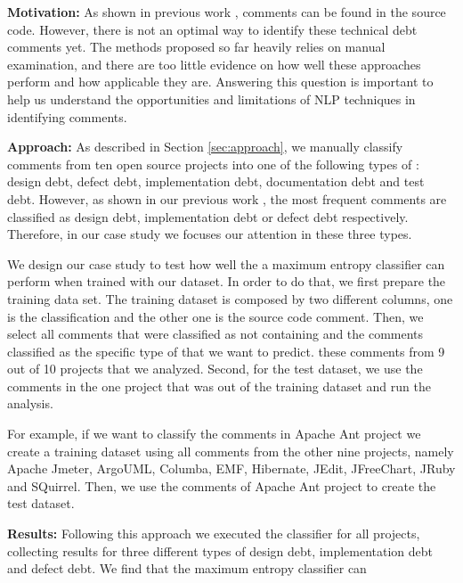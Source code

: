 \vspace{3mm}
\noindent\rqi
\vspace{3mm}

\noindent \textbf{Motivation:} As shown in previous work \cite{Potdar2014ICSME, Maldonado2015MTD}, \SATD comments can be found in the source code. However, there is not an optimal way to identify these technical debt comments yet. The methods proposed so far heavily relies on manual examination, and there are too little evidence on how well these approaches perform and how applicable they are. Answering this question is important to help us understand the opportunities and limitations of NLP techniques in identifying \SATD comments. 

\vspace{1mm}
\noindent \textbf{Approach:} As described in Section \ref{sec:approach}, we manually classify comments from ten open source projects into one of the following types of \SATD: design debt, defect debt, implementation debt, documentation debt and test debt. However, as shown in our previous work \cite{Maldonado2015MTD}, the most frequent \SATD comments are classified as design debt, implementation debt or defect debt respectively. Therefore, in our case study we focuses our attention in these three \SATD types. 

We design our case study to test how well the a maximum entropy classifier can perform when trained with our dataset. In order to do that, we first prepare the training data set. The training dataset is composed by two different columns, one is the classification and the other one is the source code comment. Then, we select all comments that were classified as not containing \SATD and the comments classified as the specific type of \SATD  that we want to predict. these comments from 9 out of 10 projects that we analyzed. Second, for the test dataset, we use the comments in the one project that was out of the training dataset and run the analysis.  

For example, if we want to classify the \SATD comments in Apache Ant project we create a training dataset using all comments from the other nine projects, namely Apache Jmeter, ArgoUML, Columba, EMF, Hibernate, JEdit, JFreeChart, JRuby and SQuirrel. Then, we use the comments of Apache Ant project to create the test dataset. 


\vspace{1mm}
\noindent \textbf{Results:} Following this approach we executed the classifier for all projects, collecting results for three different types of \SATD design debt, implementation debt and defect debt. We find that the maximum entropy classifier can

